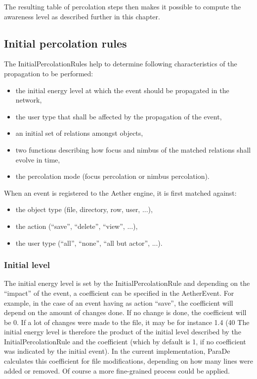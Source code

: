 \documentclass{ecscw2007}
\begin{document}
The resulting table of percolation steps then makes it possible to compute the awareness level as described further in this chapter.

\subsection*{Initial percolation rules}
The InitialPercolationRules help to determine following characteristics of the propagation to be performed:
\begin{itemize}
   \item the initial energy level at which the event should be propagated in the network,
   \item the user type that shall be affected by the propagation of the event,
   \item an initial set of relations amongst objects,
   \item two functions describing how focus and nimbus of the matched relations shall evolve in time,
   \item the percolation mode (focus percolation or nimbus percolation).
\end{itemize}

When an event is registered to the Aether engine, it is first matched against:
\begin{itemize}
   \item the object type (file, directory, row, user, ...),
   \item the action (``save'', ``delete'', ``view'', ...),
   \item the user type (``all'', ``none'', ``all but actor'', ...).
\end{itemize}

\subsubsection*{Initial level}
The initial energy level is set by the InitialPercolationRule and depending on the ``impact'' of the event, a coefficient can be specified in the AetherEvent. For example, in the case of an event having as action ``save'', the coefficient will depend on the amount of changes done. If no change is done, the coefficient will be 0. If a lot of changes were made to the file, it may be for instance 1.4 (40%
The initial energy level is therefore the product of the initial level described by the InitialPercolationRule and the coefficient (which by default is 1, if no coefficient was indicated by the initial event).
In the current implementation, ParaDe calculates this coefficient for file modifications, depending on how many lines were added or removed. Of course a more fine-grained process could be applied.
\end{document}
